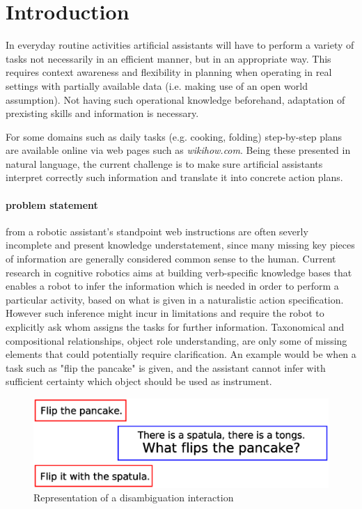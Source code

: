 \documentclass[oribibl]{llncs}
\begin{document}
\section{Introduction}
In everyday routine activities artificial assistants will have to perform a variety of tasks not necessarily in an efficient manner, but in an appropriate way. This requires context awareness and flexibility in planning when operating in real settings with partially available data (i.e. making use of an open world assumption). Not having such operational knowledge beforehand, adaptation of prexisting skills and information is necessary.

For some domains such as daily tasks (e.g. cooking, folding) step-by-step plans are available online via 
web pages such as \textit{wikihow.com}. Being these presented in natural language, the current challenge is to make sure artificial assistants interpret correctly such information and translate it into concrete action plans.

\paragraph{problem statement} from a robotic assistant's standpoint web instructions are often severly incomplete and present knowledge understatement, since many missing key pieces of information are generally considered common sense to the human. Current research in cognitive robotics aims at building verb-specific knowledge bases that enables a robot to infer the information which is needed in order to perform a particular activity, based on what is given in a naturalistic action specification.  
However such inference might incur in limitations and require the robot to explicitly ask whom assigns the tasks for further information. Taxonomical and compositional relationships, object role understanding, are only some of missing elements that could potentially require clarification. An example would be when a task such as "flip the pancake" is given, and the assistant cannot infer with sufficient certainty which object should be used as instrument.

\begin{figure}[H]
\includegraphics[scale=0.51, trim= 0mm 0mm 0mm 10mm]{introduction.eps}
\caption{Representation of a disambiguation interaction}
\end{figure} 
\end{document}
